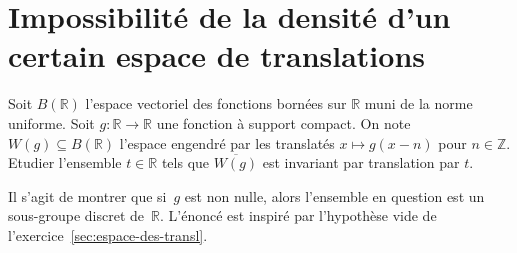 \section{Impossibilité de la densité d'un certain espace de translations}

Soit  $B(\mathbb{R})$  l'espace vectoriel des fonctions bornées sur $\mathbb{R}$ muni de la norme uniforme.
Soit $g : \mathbb{R}\to \mathbb{R}$ une fonction à support compact. On note $W(g)\subseteq B(\mathbb{R})$ l'espace engendré par les translatés $x\mapsto g(x -n)$ pour $n\in \mathbb{Z}$.
Etudier l'ensemble  $t\in \mathbb{R}$ tels que $\overline{W(g)}$ est invariant par translation par $t$.

\begin{em}
  Il s'agit de montrer que si~$g$ est non nulle, alors l'ensemble en question est un sous-groupe discret de~$\mathbb{R}$.
  L'énoncé est inspiré par l'hypothèse vide de l'exercice~\ref{sec:espace-des-transl}.
\end{em}

